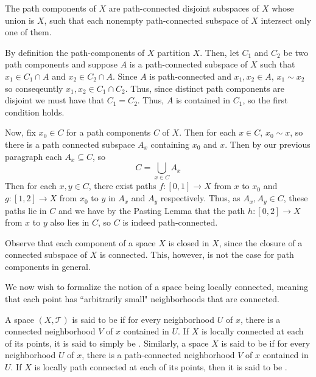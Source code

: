 \documentclass[12pt, a4paper, twoside, openright, titlepage]{book}
\begin{document}
\begin{thm}{}{}
    The path components of $X$ are path-connected disjoint subspaces of $X$ whose union is $X$, such that each nonempty path-connected subspace of $X$ intersect only one of them.
\end{thm}
\begin{proof*}{}{}
    By definition the path-components of $X$ partition $X$. Then, let $C_1$ and $C_2$ be two path components and suppose $A$ is a path-connected subspace of $X$ such that $x_1 \in C_1 \cap A$ and $x_2 \in C_2 \cap A$. Since $A$ is path-connected and $x_1, x_2 \in A$, $x_1 \sim x_2$ so conseqeuntly $x_1,x_2 \in C_1 \cap C_2$. Thus, since distinct path components are disjoint we must have that $C_1 = C_2$. Thus, $A$ is contained in $C_1$, so the first condition holds.

    Now, fix $x_0 \in C$ for a path components $C$ of $X$. Then for each $x \in C$, $x_0 \sim x$, so there is a path connected subspace $A_x$ containing $x_0$ and $x$. Then by our previous paragraph each $A_x \subseteq C$, so \begin{equation*}
        C =\bigcup\limits_{x\in C}A_x
    \end{equation*}
    Then for each $x,y \in C$, there exist paths $f:[0,1]\rightarrow X$ from $x$ to $x_0$ and $g:[1,2]\rightarrow X$ from $x_0$ to $y$ in $A_x$ and $A_y$ respectively. Thus, as $A_x,A_y \in C$, these paths lie in $C$ and we have by the Pasting Lemma that the path $h:[0,2]\rightarrow X$ from $x$ to $y$ also lies in $C$, so $C$ is indeed path-connected.
\end{proof*}

Observe that each component of a space $X$ is closed in $X$, since the closure of a connected subspace of $X$ is connected. This, however, is not the case for path components in general.

We now wish to formalize the notion of a space being locally connected, meaning that each point has ``arbitrarily small" neighborhoods that are connected.

\begin{defn}{}{}
    A space $(X,\mathcal{T})$ is said to be  if for every neighborhood $U$ of $x$, there is a connected neighborhood $V$ of $x$ contained in $U$. If $X$ is locally connected at each of its points, it is said to simply be . Similarly, a space $X$ is said to be  if for every neighborhood $U$ of $x$, there is a path-connected neighborhood $V$ of $x$ contained in $U$. If $X$ is locally path connected at each of its points, then it is said to be .
\end{defn}
\end{document}
